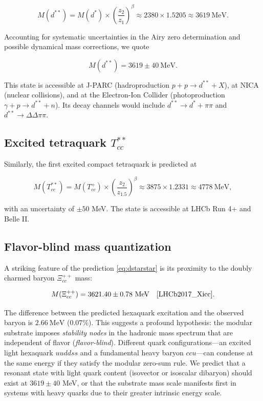 \documentclass[12pt,a4paper]{article}
\theoremstyle{plain}
\theoremstyle{definition}
\theoremstyle{remark}
\begin{document}
\begin{equation}
M(d^{**}) = M(d^*) \times \left(\frac{z_2}{z_1}\right)^\beta \approx 2380 \times 1.5205 \approx 3619\ \text{MeV}.
\label{eq:dstarstar}
\end{equation}

Accounting for systematic uncertainties in the Airy zero determination and possible dynamical mass corrections, we quote

\begin{equation}
M(d^{**}) = 3619 \pm 40\ \text{MeV}.
\label{eq:dstarstar_pred}
\end{equation}

This state is accessible at J-PARC (hadroproduction \(p+p \to d^{**} + X\)), at NICA (nuclear collisions), and at the Electron-Ion Collider (photoproduction \(\gamma + p \to d^{**} + n\)). Its decay channels would include \(d^{**} \to d^* + \pi\pi\) and \(d^{**} \to \Delta\Delta\pi\pi\).

\subsection{Excited tetraquark \(T_{cc}^{**}\)}
Similarly, the first excited compact tetraquark is predicted at

\begin{equation}
M(T_{cc}^{**}) = M(T_{cc}^+) \times \left(\frac{z_2}{z_{1.5}}\right)^\beta \approx 3875 \times 1.2331 \approx 4778\ \text{MeV},
\label{eq:Tccstarstar}
\end{equation}

with an uncertainty of \(\pm 50\) MeV. The state is accessible at LHCb Run 4+ and Belle II.

\subsection{Flavor-blind mass quantization}
A striking feature of the prediction \eqref{eq:dstarstar} is its proximity to the doubly charmed baryon \(\Xi_{cc}^{++}\) mass:

\begin{equation}
M(\Xi_{cc}^{++}) = 3621.40 \pm 0.78\ \text{MeV} \quad \text{\cite{LHCb2017_Xicc}}.
\label{eq:Xicc}
\end{equation}

The difference between the predicted hexaquark excitation and the observed baryon is \(2.66\ \text{MeV}\) (\(0.07\%\)). This suggests a profound hypothesis: the modular substrate imposes \emph{stability nodes} in the hadronic mass spectrum that are independent of flavor (\emph{flavor-blind}). Different quark configurations---an excited light hexaquark \(uuddss\) and a fundamental heavy baryon \(ccu\)---can condense at the same energy if they satisfy the modular zero-sum rule. We predict that a resonant state with light quark content (isovector or isoscalar dibaryon) should exist at \(3619 \pm 40\) MeV, or that the substrate mass scale manifests first in systems with heavy quarks due to their greater intrinsic energy scale.
\end{document}
